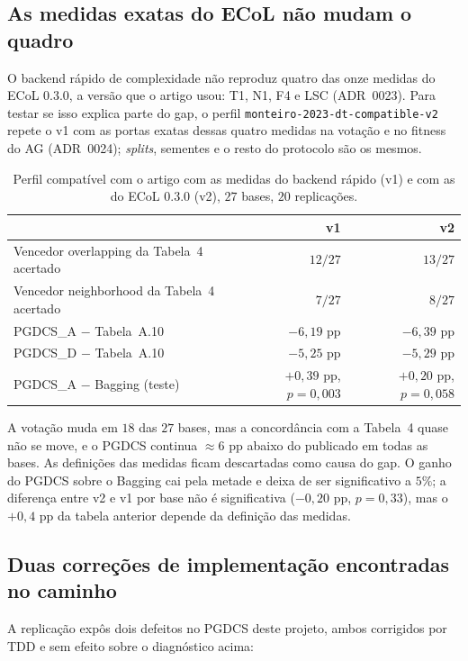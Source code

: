 \subsection{As medidas exatas do ECoL não mudam o quadro}

O backend rápido de complexidade não reproduz quatro das onze medidas do ECoL
0.3.0, a versão que o artigo usou: T1, N1, F4 e LSC (ADR~0023). Para testar se
isso explica parte do gap, o perfil \texttt{monteiro-2023-dt-compatible-v2}
repete o v1 com as portas exatas dessas quatro medidas na votação e no fitness
do AG (ADR~0024); \emph{splits}, sementes e o resto do protocolo são os mesmos.

\begin{table}[htbp]
\centering\small
\caption{Perfil compatível com o artigo com as medidas do backend rápido (v1) e
com as do ECoL 0.3.0 (v2), $27$ bases, $20$ replicações.}
\begin{tabular}{lrr}
\toprule
 & v1 & v2 \\
\midrule
Vencedor overlapping da Tabela~4 acertado & $12/27$ & $13/27$ \\
Vencedor neighborhood da Tabela~4 acertado & $7/27$ & $8/27$ \\
\mvr{} PGDCS\_A $-$ Tabela~A.10 & $-6{,}19$ pp & $-6{,}39$ pp \\
\mvr{} PGDCS\_D $-$ Tabela~A.10 & $-5{,}25$ pp & $-5{,}29$ pp \\
PGDCS\_A $-$ Bagging (teste) & $+0{,}39$ pp, $p=0{,}003$ & $+0{,}20$ pp, $p=0{,}058$ \\
\bottomrule
\end{tabular}
\end{table}

A votação muda em $18$ das $27$ bases, mas a concordância com a Tabela~4 quase
não se move, e o PGDCS continua $\approx6$ pp abaixo do publicado em todas as
bases. As definições das medidas ficam descartadas como causa do gap. O ganho do
PGDCS sobre o Bagging cai pela metade e deixa de ser significativo a $5\%$; a
diferença entre v2 e v1 por base não é significativa ($-0{,}20$ pp, $p=0{,}33$),
mas o $+0{,}4$ pp da tabela anterior depende da definição das medidas.

\subsection{Duas correções de implementação encontradas no caminho}

A replicação expôs dois defeitos no PGDCS deste projeto, ambos corrigidos por TDD e
sem efeito sobre o diagnóstico acima:


